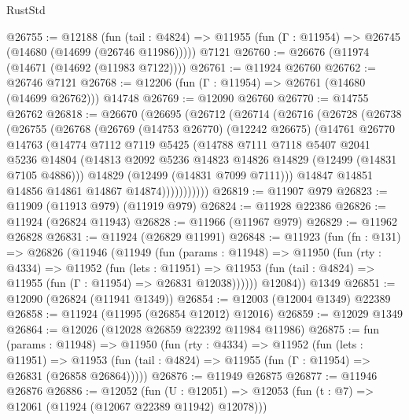 \begin{lexlean}{RustStd}
\begin{coremodule}
{\begin{coremodule}
{{{{{{{{{{{{{{{{{{{{{{{{{{{{{{{{{{{{{{{{{{{{{{{{{{{{{{{{{{{{{{{{{{{{{{{{{{{{{{{{@26755 := @12188
    (fun (tail : @4824) => @11955 (fun (Γ : @11954) => @26745 (@14680 (@14699 (@26746 @11986)))))
    @7121
@26760 := @26676 (@11974 (@14671 (@14692 (@11983 @7122))))
@26761 := @11924 @26760
@26762 := @26746 @7121
@26768 := @12206 (fun (Γ : @11954) => @26761 (@14680 (@14699 @26762))) @14748
@26769 := @12090 @26760
@26770 := @14755 @26762
@26818 := @26670
    (@26695
      (@26712
        (@26714
          (@26716
            (@26728
              (@26738
                (@26755
                  (@26768
                    (@26769
                      (@14753 @26770)
                      (@12242 @26675)
                      (@14761
                        @26770
                        @14763
                        (@14774
                          @7112
                          @7119
                          @5425
                          (@14788
                            @7111
                            @7118
                            @5407
                            @2041
                            @5236
                            @14804
                            (@14813 @2092 @5236 @14823 @14826 @14829 (@12499 (@14831 @7105 @4886)))
                            @14829
                            (@12499 (@14831 @7099 @7111)))
                          @14847
                          @14851
                          @14856
                          @14861
                          @14867
                          @14874)))))))))))
@26819 := @11907 @979
@26823 := @11909 (@11913 @979) (@11919 @979)
@26824 := @11928 @22386
@26826 := @11924 (@26824 @11943)
@26828 := @11966 (@11967 @979)
@26829 := @11962 @26828
@26831 := @11924 (@26829 @11991)
@26848 := @11923
    (fun (fn : @131) =>
    @26826
      (@11946
        (@11949
          (fun (params : @11948) =>
          @11950
            (fun (rty : @4334) =>
            @11952
              (fun (lets : @11951) =>
              @11953 (fun (tail : @4824) => @11955 (fun (Γ : @11954) => @26831 @12038))))))
        @12084))
    @1349
@26851 := @12090 (@26824 (@11941 @1349))
@26854 := @12003 (@12004 @1349) @22389
@26858 := @11924 (@11995 (@26854 @12012) @12016)
@26859 := @12029 @1349
@26864 := @12026 (@12028 @26859 @22392 @11984 @11986)
@26875 := fun (params : @11948) =>
  @11950
    (fun (rty : @4334) =>
    @11952
      (fun (lets : @11951) =>
      @11953 (fun (tail : @4824) => @11955 (fun (Γ : @11954) => @26831 (@26858 @26864)))))
@26876 := @11949 @26875
@26877 := @11946 @26876
@26886 := @12052
    (fun (U : @12051) => @12053 (fun (t : @7) => @12061 (@11924 (@12067 @22389 @11942) @12078)))
}}}}}}}}}}}}}}}}}}}}}}}}}}}}}}}}}}}}}}}}}}}}}}}}}}}}}}}}}}}}}}}}}}}}}}}}}}}}}}}}
\end{coremodule}}
\end{coremodule}
\end{lexlean}
